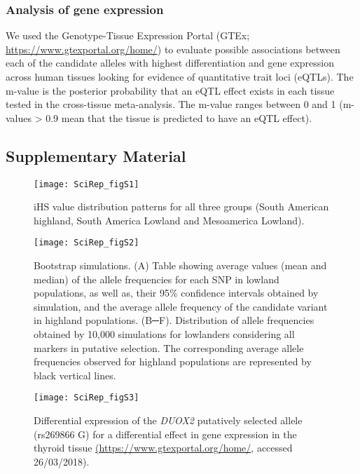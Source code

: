 \subsubsection{Analysis of gene expression}

We used the Genotype-Tissue Expression Portal (GTEx; \url{https://www.gtexportal.org/home/}) to evaluate possible associations between each of the candidate alleles with highest differentiation and gene expression across human tissues looking for evidence of quantitative trait loci (eQTLs). The m-value is the posterior probability that an eQTL effect exists in each tissue tested in the cross-tissue meta-analysis. The m-value ranges between 0 and 1 (m-values > 0.9 mean that the tissue is predicted to have an eQTL effect).

\clearpage
\subsection{Supplementary Material}





\begin{figure}[!htbp]
    \vspace{2cm}
    \centering
    \texttt{[image: SciRep\_figS1]}
    \caption{iHS value distribution patterns for all three groups (South American highland, South America Lowland and Mesoamerica Lowland).}
    \label{fig:SciRep_figS1}
\end{figure}

\begin{figure}[!htbp]
    \centering
    \texttt{[image: SciRep\_figS2]}
    \caption[Bootstrap simulations]{Bootstrap simulations. (A) Table showing average values (mean and median) of the allele frequencies for each SNP in lowland populations, as well as, their 95\% confidence intervals obtained by simulation, and the average allele frequency of the candidate variant in highland populations. (B─F). Distribution of allele frequencies obtained by 10,000 simulations for lowlanders considering all markers in putative selection. The corresponding average allele frequencies observed for highland populations are represented by black vertical lines.}
    \label{fig:SciRep_figS2}
\end{figure}

\begin{figure}[hp]
    \centering
    \texttt{[image: SciRep\_figS3]}
    \caption[Differential expression of the \textsl{DUOX2} putatively selected allele.]{Differential expression of the \textsl{DUOX2} putatively selected allele (rs269866 G) for a differential effect in gene expression in the thyroid tissue \url{(https://www.gtexportal.org/home/}, accessed 26/03/2018).}
    \label{fig:SciRep_figS3}
\end{figure}

